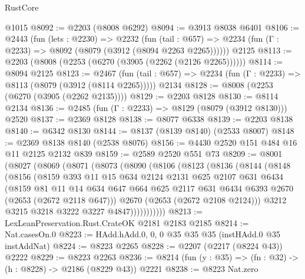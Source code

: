 \begin{lexlean}{RustCore}
\begin{coremodule}
    @1015
@8092 := @2203 (@8008 @6292)
@8094 := @3913 @8038 @6401
@8106 := @2443
    (fun (lets : @2230) =>
    @2232
      (fun (tail : @657) => @2234 (fun (Γ : @2233) => @8092 (@8079 (@3912 (@8094 @2263 @2265))))))
    @2125
@8113 := @2203 (@8008 (@2253 (@6270 (@3905 (@2262 (@2126 @2265))))))
@8114 := @8094 @2125
@8123 := @2467
    (fun (tail : @657) => @2234 (fun (Γ : @2233) => @8113 (@8079 (@3912 (@8114 @2265)))))
    @2134
@8128 := @8008 (@2253 (@6270 (@3905 (@2262 @2135))))
@8129 := @2203 @8128
@8130 := @8114 @2134
@8136 := @2485 (fun (Γ : @2233) => @8129 (@8079 (@3912 @8130))) @2520
@8137 := @2369 @8128
@8138 := @8077 @6338
@8139 := @2203 @8138
@8140 := @6342 @8130
@8144 := @8137 (@8139 @8140) (@2533 @8007)
@8148 := @2369 @8138 @8140 (@2538 @8076)
@8156 := @4430 @2520 @151 @484 @16 @11 @2125 @2132 @839
@8159 := @2589 @2520 @551 @73
@8209 := @8001
    (@8027
      (@8069
        (@8071
          (@8073
            (@8090
              (@8106
                (@8123
                  (@8136
                    (@8144
                      (@8148
                        (@8156
                          (@8159
                            @393
                            @11
                            @15
                            @634
                            @2124
                            @2131
                            @625
                            @2107
                            @631
                            @6434
                            (@8159
                              @81
                              @11
                              @14
                              @634
                              @647
                              @664
                              @625
                              @2117
                              @631
                              @6434
                              @6393
                              @2670
                              (@2653 (@2672 @2118 @647)))
                            @2670
                            (@2653 (@2672 @2108 @2124)))
                          @3212
                          @3215
                          @3218
                          @3222
                          @3227
                          @4847)))))))))))
@8213 := LexLeanPreservation.Rust.CrateOK @2181 @2183 @2185
@8214 := Nat.casesOn.{0}
@8223 := HAdd.hAdd.{0, 0, 0} @35 @35 @35 (instHAdd.{0} @35 instAddNat)
@8224 := @8223 @2265
@8228 := @2207 (@2217 (@8224 @43)) @2222
@8229 := @8223 @2263
@8236 := @8214 (fun (y : @35) => (fn : @32) -> (h : @8228) -> @2186 (@8229 @43)) @2221
@8238 := @8223 Nat.zero

\end{coremodule}
\end{lexlean}
